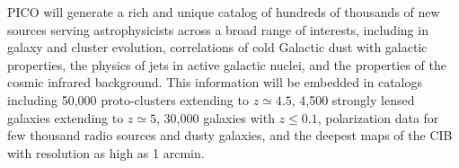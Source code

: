 \documentclass[PICOAPC.tex]{subfiles}
\begin{document}

PICO will generate a rich and unique catalog of hundreds of thousands of new sources serving astrophysicists across a broad range of interests, including in galaxy and cluster evolution, correlations of cold Galactic dust with galactic properties, the physics of jets in active galactic nuclei, and the properties of the cosmic infrared background. This information will be embedded in catalogs including 50,000 proto-clusters extending to $z\simeq 4.5$, 4,500 strongly lensed galaxies extending to $z\simeq 5$, 30,000 galaxies with $z\leq 0.1$, polarization data for few thousand radio sources and dusty galaxies, and the deepest maps of the CIB with resolution as high as 1 arcmin. 
\end{document}
